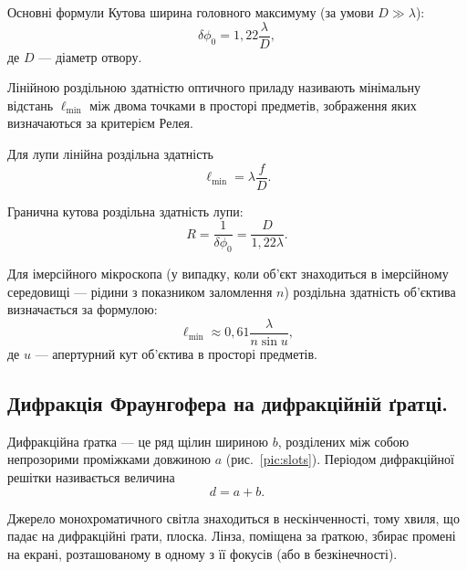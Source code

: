 \begin{Theory}{Основні формули}
    Кутова ширина головного максимуму (за умови $D \gg \lambda$):
    \begin{equation}\label{eq:Difraction_Hole_min}
        \delta\phi_0 = 1,22\frac{\lambda}{D},
    \end{equation}
    де $D$ --- діаметр отвору.

    Лінійною роздільною здатністю оптичного приладу називають мінімальну відстань $\ell_{\min}$ між двома точками в просторі предметів, зображення яких визначаються за критерієм Релея.

    Для лупи лінійна роздільна здатність
    \begin{equation}\label{eq:Difraction_linear_R}
        \ell_{\min} = \lambda\frac{f}{D}.
    \end{equation}

    Гранична кутова роздільна здатність лупи:
    \begin{equation}\label{eq:Difraction_R}
        R = \frac{1}{\delta\phi_0} = \frac{D}{1,22 \lambda}.
    \end{equation}


    Для імерсійного мікроскопа (у випадку, коли об'єкт знаходиться в імерсійному
    середовищі --- рідини з показником заломлення $n$) роздільна здатність об'єктива визначається за формулою:
    \begin{equation}\label{eq:Difraction_immers}
        \ell_{\min} \approx 0,61 \frac{\lambda}{n\sin u},
    \end{equation}
    де $u$ ---  апертурний кут об'єктива в просторі предметів.
\end{Theory}






\subsection*{Дифракція Фраунгофера на дифракційній ґратці.}


Дифракційна ґратка --- це ряд щілин шириною $b$, розділених між собою непрозорими проміжками довжиною $a$ (рис.~\ref{pic:slots}). Періодом дифракційної решітки називається величина
\begin{equation*}
    d = a + b.
\end{equation*}


Джерело монохроматичного світла знаходиться в нескінченності, тому хвиля, що падає на дифракційні ґрати, плоска. Лінза, поміщена за ґраткою, збирає промені на екрані, розташованому в одному з її фокусів (або в безкінечності).


